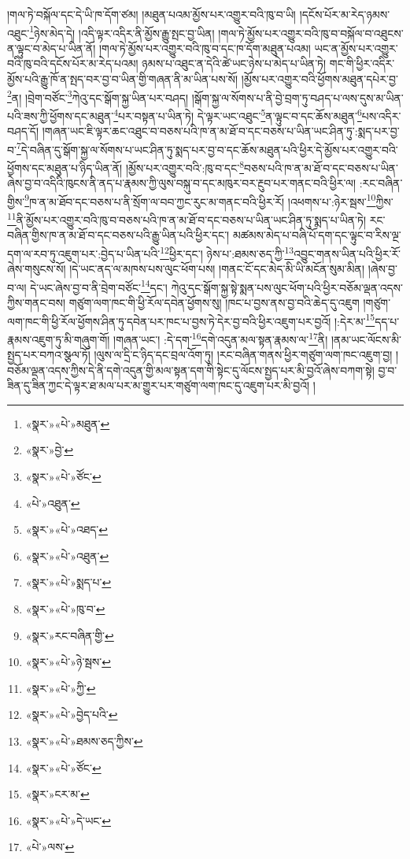 །གལ་ཏེ་བསྐོལ་དང་དེ་ཡི་ཁ་དོག་ཙམ། །མཐུན་པའམ་མྱོས་པར་འགྱུར་བའི་ཁུ་བ་ཡི། །དངོས་པོར་མ་རེད་ཉམས་འཐུང་\footnote{«སྣར་»«པེ་»མཐུན་}ཉེས་མེད་དེ། །འདི་ལྟར་འདིར་ནི་མྱོས་རྒྱུ་སྤང་བྱ་ཡིན། །གལ་ཏེ་མྱོས་པར་འགྱུར་བའི་ཁུ་བ་བསྐོལ་བ་འཐུངས་ན་ལྟུང་བ་མེད་པ་ཡིན་ནོ། །གལ་ཏེ་མྱོས་པར་འགྱུར་བའི་ཁུ་བ་དང་ཁ་དོག་མཐུན་པའམ། ཡང་ན་མྱོས་པར་འགྱུར་བའི་ཁུ་བའི་དངོས་པོར་མ་རེད་པའམ། ཉམས་པ་འཐུང་ན་དེའི་ཚེ་ཡང་ཉེས་པ་མེད་པ་ཡིན་ཏེ། གང་གི་ཕྱིར་འདིར་མྱོས་པའི་རྒྱུ་ཁོ་ན་སྤད་བར་བྱ་བ་ཡིན་གྱི་གཞན་ནི་མ་ཡིན་པས་སོ། །མྱོས་པར་འགྱུར་བའི་ཕྱོགས་མཐུན་དཔེར་བྱ་\footnote{«སྣར་»བྱེ་}ན། །བྲེག་བཙོང་\footnote{«སྣར་»«པེ་»ཙོང་}ཀེའུ་དང་སྒོག་སྐྱ་ཡིན་པར་བཤད། །སྒོག་སྐྱ་ལ་སོགས་པ་ནི་བྱེ་བྲག་ཏུ་བཤད་པ་ལས་དུས་མ་ཡིན་པའི་ཟས་ཀྱི་ཕྱོགས་དང་མཐུན་\footnote{«པེ་»འཐུན་}པར་བསྟན་པ་ཡིན་ཏེ། དེ་ལྟར་ཡང་འཐུང་\footnote{«སྣར་»«པེ་»འཐད་}ན་ལྟུང་བ་དང་ཆོས་མཐུན་\footnote{«སྣར་»«པེ་»འཐུན་}པས་འདིར་བཤད་དོ། །གཞན་ཡང་ཇི་ལྟར་ཆང་འཐུང་བ་བཅས་པའི་ཁ་ན་མ་ཐོ་བ་དང་བཅས་པ་ཡིན་ཡང་ཤིན་ཏུ་:སྨད་པར་བྱ་བ་\footnote{«སྣར་»«པེ་»སྨད་པ་}དེ་བཞིན་དུ་སྒོག་སྐྱ་ལ་སོགས་པ་ཡང་ཤིན་ཏུ་སྨད་པར་བྱ་བ་དང་ཆོས་མཐུན་པའི་ཕྱིར་དེ་མྱོས་པར་འགྱུར་བའི་ཕྱོགས་དང་མཐུན་པ་ཉིད་ཡིན་ནོ། །མྱོས་པར་འགྱུར་བའི་:ཁུ་བ་དང་\footnote{«སྣར་»«པེ་»ཁུ་བ་}བཅས་པའི་ཁ་ན་མ་ཐོ་བ་དང་བཅས་པ་ཡིན་ཞེས་བྱ་བ་འདིའི་ཁུངས་ནི་ནད་པ་རྣམས་ཀྱི་ལུས་བསྐུ་བ་དང་མཁུར་བར་རྔུབ་པར་གནང་བའི་ཕྱིར་ལ། :རང་བཞིན་གྱིས་\footnote{«སྣར་»རང་བཞིན་གྱི་}ཁ་ན་མ་ཐོབ་དང་བཅས་པ་ནི་སྲོག་ལ་བབ་ཀྱང་རུང་མ་གནང་བའི་ཕྱིར་རོ། །འཕགས་པ་:ཉེར་སྦས་\footnote{«སྣར་»«པེ་»ཉེ་སྦས་}ཀྱིས་\footnote{«སྣར་»«པེ་»ཀྱི་}ནི་མྱོས་པར་འགྱུར་བའི་ཁུ་བ་བཅས་པའི་ཁ་ན་མ་ཐོ་བ་དང་བཅས་པ་ཡིན་ཡང་ཤིན་ཏུ་སྨད་པ་ཡིན་ཏེ། རང་བཞིན་གྱིས་ཁ་ན་མ་ཐོ་བ་དང་བཅས་པའི་རྒྱུ་ཡིན་པའི་ཕྱིར་དང་། མཚམས་མེད་པ་བཞི་པོ་དག་དང་ལྟུང་བ་རིས་ལྔ་དག་ལ་རབ་ཏུ་འཇུག་པར་:བྱེད་པ་ཡིན་པའི་\footnote{«སྣར་»«པེ་»བྱེད་པའི་}ཕྱིར་དང་། ཉེས་པ་:ཐམས་ཅད་ཀྱི་\footnote{«སྣར་»«པེ་»ཐམས་ཅད་ཀྱིས་}འབྱུང་གནས་ཡིན་པའི་ཕྱིར་རོ་ཞེས་གསུངས་སོ། །དེ་ཡང་ནད་ལ་མཁས་པས་ལུང་ཕོག་པས། །གནང་ངོ་དང་མེད་མི་ཡི་མངོན་སུམ་མིན། །ཞེས་བྱ་བ་ལ། དེ་ཡང་ཞེས་བྱ་བ་ནི་བྲེག་བཙོང་\footnote{«སྣར་»«པེ་»ཙོང་}དང་། ཀེའུ་དང་སྒོག་སྐྱ་སྟེ་སྨན་པས་ལུང་ཕོག་པའི་ཕྱིར་བཅོམ་ལྡན་འདས་ཀྱིས་གནང་བས། གཙུག་ལག་ཁང་གི་ཕྱི་རོལ་དབེན་ཕྱོགས་སུ། །ཁང་པ་བྱས་ནས་བྱ་བའི་ཆེད་དུ་འཇུག །གཙུག་ལག་ཁང་གི་ཕྱི་རོལ་ཕྱོགས་ཤིན་ཏུ་དབེན་པར་ཁང་པ་བྱས་ཏེ་དེར་བྱ་བའི་ཕྱིར་འཇུག་པར་བྱའོ། །:དེར་མ་\footnote{«སྣར་»ངར་མ་}དད་པ་རྣམས་འཇུག་ཏུ་མི་གཞུག་གོ། །གཞན་ཡང་། :དེ་དག་\footnote{«སྣར་»«པེ་»དེ་ཡང་}དགེ་འདུན་མལ་སྟན་རྣམས་ལ་\footnote{«པེ་»ལས་}ནི། །ནམ་ཡང་ལོངས་མི་སྤྱད་པར་བཀའ་སྩལ་ཏོ། །ལུས་ལ་དྲི་ང་ཉིད་དང་བྲལ་འོག་ཏུ། །རང་བཞིན་གནས་ཕྱིར་གཙུག་ལག་ཁང་འཇུག་བྱ། །བཅོམ་ལྡན་འདས་ཀྱིས་དེ་ནི་དགེ་འདུན་གྱི་མལ་སྟན་དག་གི་སྟེང་དུ་ལོངས་སྤྱད་པར་མི་བྱའོ་ཞེས་བཀག་སྟེ། བྱ་བ་ཟིན་དུ་ཟིན་ཀྱང་དེ་ལྟར་ཐ་མལ་པར་མ་གྱུར་པར་གཙུག་ལག་ཁང་དུ་འཇུག་པར་མི་བྱའོ། །
